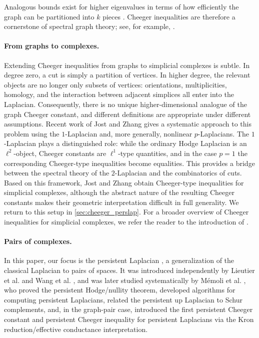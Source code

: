 \documentclass{article}
\begin{document}
Analogous bounds exist for higher eigenvalues in terms of how efficiently the graph can be partitioned into \(k\) pieces \cite{lee2014multiway}. Cheeger inequalities are therefore a cornerstone of spectral graph theory; see, for example, \cite{MR1421568,nica2018brief}.

\paragraph{From graphs to complexes.}
Extending Cheeger inequalities from graphs to simplicial complexes is subtle. In degree zero, a cut is simply a partition of vertices. In higher degree, the relevant objects are no longer only subsets of vertices: orientations, multiplicities, homology, and the interaction between adjacent simplices all enter into the Laplacian. Consequently, there is no unique higher-dimensional analogue of the graph Cheeger constant, and different definitions are appropriate under different assumptions. Recent work of Jost and Zhang \cite{jost2024cheeger} gives a systematic approach to this problem using the \(1\)-Laplacian and, more generally, nonlinear \(p\)-Laplacians. The \(1\)-Laplacian plays a distinguished role: while the ordinary Hodge Laplacian is an \(\ell^2\)-object, Cheeger constants are \(\ell^1\)-type quantities, and in the case \(p=1\) the corresponding Cheeger-type inequalities become equalities. This provides a bridge between the spectral theory of the \(2\)-Laplacian and the combinatorics of cuts. Based on this framework, Jost and Zhang obtain Cheeger-type inequalities for simplicial complexes, although the abstract nature of the resulting Cheeger constants makes their geometric interpretation difficult in full generality. We return to this setup in \cref{sec:cheeger_perslap}. For a broader overview of Cheeger inequalities for simplicial complexes, we refer the reader to the introduction of \cite{jost2024cheeger}.

\paragraph{Pairs of complexes.}
In this paper, our focus is the persistent Laplacian \cite{MR4164275,pers_lap,gen_pers_lap}, a generalization of the classical Laplacian to pairs of spaces. It was introduced independently by Lieutier et al. \cite{lapslides} and Wang et al. \cite{MR4164275}, and was later studied systematically by M\'emoli et al. \cite{pers_lap}, 
who proved the persistent Hodge/nullity theorem, developed algorithms for computing persistent Laplacians, related the persistent
 up Laplacian to Schur complements, and, in the graph-pair case, introduced the first persistent Cheeger constant and persistent Cheeger inequality for persistent Laplacians via the Kron reduction/effective conductance interpretation.
\end{document}
